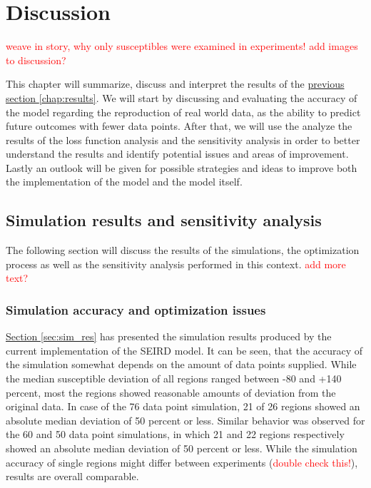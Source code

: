 
\chapter{Discussion} %
\label{chap:discussion} %
\textcolor{red}{weave in story, why only susceptibles were examined in experiments!}
\textcolor{red}{add images to discussion?}


This chapter will summarize, discuss and interpret the results of the \hyperref[chap:results]{previous section
\ref*{chap:results}}. We will start by discussing and evaluating the accuracy of the model regarding the reproduction
of real world data, as the ability to predict future outcomes with fewer data points. After that, we will use the
analyze the results of the loss function analysis and the sensitivity analysis in order to better understand the results
and identify potential issues and areas of improvement. Lastly an outlook will be given for possible strategies and
ideas to improve both the implementation of the model and the model itself.

\section{Simulation results and sensitivity analysis}
The following section will discuss the results of the simulations, the optimization process as well as the sensitivity
analysis performed in this context.
\textcolor{red}{add more text?}


\subsection{Simulation accuracy and optimization issues}
\hyperref[sec:sim_res]{Section \ref*{sec:sim_res}} has presented the simulation results produced by the current implementation
of the SEIRD model. It can be seen, that the accuracy of the simulation somewhat depends on the amount of data points supplied.
While the median susceptible deviation of all regions ranged between -80 and +140 percent, most the regions showed reasonable
amounts of deviation from the original data. In case of the 76 data point simulation, 21 of 26 regions showed an
absolute median deviation of 50 percent or less. Similar behavior was observed for the 60 and 50 data point simulations, in which
21 and 22 regions respectively showed an absolute median deviation of 50 percent or less. While the simulation accuracy of single regions
might differ between experiments (\textcolor{red}{double check this!}), results are overall comparable.\newline

